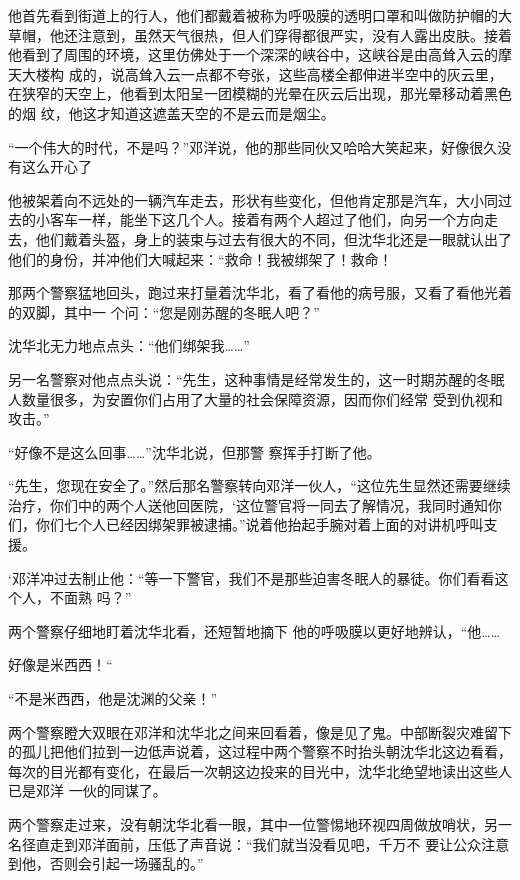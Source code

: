 \documentclass{article}
\begin{document}
他首先看到街道上的行人，他们都戴着被称为呼吸膜的透明口罩和叫做防护帽的大草帽，他还注意到，虽然天气很热，但人们穿得都很严实，没有人露出皮肤。接着他看到了周围的环境，这里仿佛处于一个深深的峡谷中，这峡谷是由高耸入云的摩天大楼构
\newpage
成的，说高耸入云一点都不夸张，这些高楼全都伸进半空中的灰云里，在狭窄的天空上，他看到太阳呈一团模糊的光晕在灰云后出现，那光晕移动着黑色的烟
纹，他这才知道这遮盖天空的不是云而是烟尘。 

“一个伟大的时代，不是吗？”邓洋说，他的那些同伙又哈哈大笑起来，好像很久没有这么开心了

他被架着向不远处的一辆汽车走去，形状有些变化，但他肯定那是汽车，大小同过去的小客车一样，能坐下这几个人。接着有两个人超过了他们，向另一个方向走去，他们戴着头盔，身上的装束与过去有很大的不同，但沈华北还是一眼就认出了他们的身份，并冲他们大喊起来：“救命！我被绑架了！救命！

那两个警察猛地回头，跑过来打量着沈华北，看了看他的病号服，又看了看他光着的双脚，其中一
个问：“您是刚苏醒的冬眠人吧？” 


沈华北无力地点点头：“他们绑架我……” 

\newpage

另一名警察对他点点头说：“先生，这种事情是经常发生的，这一时期苏醒的冬眠人数量很多，为安置你们占用了大量的社会保障资源，因而你们经常
受到仇视和攻击。” 

“好像不是这么回事……”沈华北说，但那警
察挥手打断了他。 

“先生，您现在安全了。”然后那名警察转向邓洋一伙人，“这位先生显然还需要继续治疗，你们中的两个人送他回医院，‘这位警官将一同去了解情况，我同时通知你们，你们七个人已经因绑架罪被逮捕。”说着他抬起手腕对着上面的对讲机呼叫支援。

‘邓洋冲过去制止他：“等一下警官，我们不是那些迫害冬眠人的暴徒。你们看看这个人，不面熟
吗？” 

两个警察仔细地盯着沈华北看，还短暂地摘下
他的呼吸膜以更好地辨认，“他…… 

\newpage


好像是米西西！“ 


“不是米西西，他是沈渊的父亲！” 

两个警察瞪大双眼在邓洋和沈华北之间来回看着，像是见了鬼。中部断裂灾难留下的孤儿把他们拉到一边低声说着，这过程中两个警察不时抬头朝沈华北这边看看，每次的目光都有变化，在最后一次朝这边投来的目光中，沈华北绝望地读出这些人已是邓洋
一伙的同谋了。 

两个警察走过来，没有朝沈华北看一眼，其中一位警惕地环视四周做放哨状，另一名径直走到邓洋面前，压低了声音说：“我们就当没看见吧，千万不
要让公众注意到他，否则会引起一场骚乱的。” 
\end{document}

